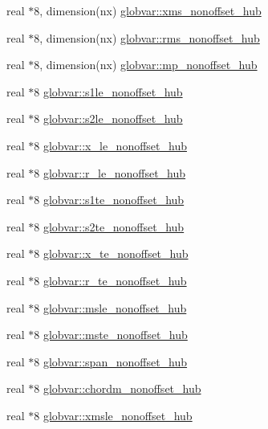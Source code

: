 \begin{DoxyCompactItemize}
real $\ast$8, dimension(nx) \hyperlink{namespaceglobvar_a4fce94b892f139d05a7972fbea0d4a8c}{globvar\+::xms\+\_\+nonoffset\+\_\+hub}
\item 
real $\ast$8, dimension(nx) \hyperlink{namespaceglobvar_a598d438487e1d0e98107a657635f77b7}{globvar\+::rms\+\_\+nonoffset\+\_\+hub}
\item 
real $\ast$8, dimension(nx) \hyperlink{namespaceglobvar_a9cc33a73476cd269f28f4637663baa64}{globvar\+::mp\+\_\+nonoffset\+\_\+hub}
\item 
real $\ast$8 \hyperlink{namespaceglobvar_ad09cdd70dbe671871fe37e6f4784fc13}{globvar\+::s1le\+\_\+nonoffset\+\_\+hub}
\item 
real $\ast$8 \hyperlink{namespaceglobvar_a8eb69430dd19178f5b03bdb675e37743}{globvar\+::s2le\+\_\+nonoffset\+\_\+hub}
\item 
real $\ast$8 \hyperlink{namespaceglobvar_a56eebc89ec38db33a07e5123a3ebee11}{globvar\+::x\+\_\+le\+\_\+nonoffset\+\_\+hub}
\item 
real $\ast$8 \hyperlink{namespaceglobvar_aa647142f05c00b609672eb515f611e3a}{globvar\+::r\+\_\+le\+\_\+nonoffset\+\_\+hub}
\item 
real $\ast$8 \hyperlink{namespaceglobvar_af297468b9676c6972847e41f78de2d25}{globvar\+::s1te\+\_\+nonoffset\+\_\+hub}
\item 
real $\ast$8 \hyperlink{namespaceglobvar_a339922829843baa5c9b7602f44111b2a}{globvar\+::s2te\+\_\+nonoffset\+\_\+hub}
\item 
real $\ast$8 \hyperlink{namespaceglobvar_abbf81b644dde8fac9df2a6f46bfb1709}{globvar\+::x\+\_\+te\+\_\+nonoffset\+\_\+hub}
\item 
real $\ast$8 \hyperlink{namespaceglobvar_a2a458742e93da2e7da417d4e0e787cc1}{globvar\+::r\+\_\+te\+\_\+nonoffset\+\_\+hub}
\item 
real $\ast$8 \hyperlink{namespaceglobvar_ab5a7740414d3a3f3b79672f336f4ed83}{globvar\+::msle\+\_\+nonoffset\+\_\+hub}
\item 
real $\ast$8 \hyperlink{namespaceglobvar_af4bd45dc8527c82a602975482604fdb1}{globvar\+::mste\+\_\+nonoffset\+\_\+hub}
\item 
real $\ast$8 \hyperlink{namespaceglobvar_a6cfba7e55403bb754be3f594a4d00d32}{globvar\+::span\+\_\+nonoffset\+\_\+hub}
\item 
real $\ast$8 \hyperlink{namespaceglobvar_a0af19e0c5bd151072f235940d7e08b48}{globvar\+::chordm\+\_\+nonoffset\+\_\+hub}
\item 
real $\ast$8 \hyperlink{namespaceglobvar_ac7ab2bdf56cf49943a096e1376844993}{globvar\+::xmsle\+\_\+nonoffset\+\_\+hub}

\end{DoxyCompactItemize}
